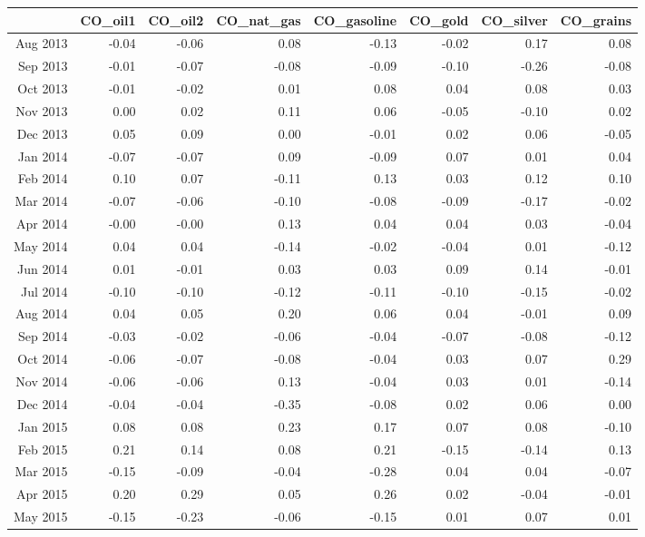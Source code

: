 \begin{tabularx}{\textwidth}{rrrrrrrr}
  \hline
 & CO\_oil1 & CO\_oil2 & CO\_nat\_gas & CO\_gasoline & CO\_gold & CO\_silver & CO\_grains \\ 
  \hline
Aug 2013 & -0.04 & -0.06 & 0.08 & -0.13 & -0.02 & 0.17 & 0.08 \\ 
  Sep 2013 & -0.01 & -0.07 & -0.08 & -0.09 & -0.10 & -0.26 & -0.08 \\ 
  Oct 2013 & -0.01 & -0.02 & 0.01 & 0.08 & 0.04 & 0.08 & 0.03 \\ 
  Nov 2013 & 0.00 & 0.02 & 0.11 & 0.06 & -0.05 & -0.10 & 0.02 \\ 
  Dec 2013 & 0.05 & 0.09 & 0.00 & -0.01 & 0.02 & 0.06 & -0.05 \\ 
  Jan 2014 & -0.07 & -0.07 & 0.09 & -0.09 & 0.07 & 0.01 & 0.04 \\ 
  Feb 2014 & 0.10 & 0.07 & -0.11 & 0.13 & 0.03 & 0.12 & 0.10 \\ 
  Mar 2014 & -0.07 & -0.06 & -0.10 & -0.08 & -0.09 & -0.17 & -0.02 \\ 
  Apr 2014 & -0.00 & -0.00 & 0.13 & 0.04 & 0.04 & 0.03 & -0.04 \\ 
  May 2014 & 0.04 & 0.04 & -0.14 & -0.02 & -0.04 & 0.01 & -0.12 \\ 
  Jun 2014 & 0.01 & -0.01 & 0.03 & 0.03 & 0.09 & 0.14 & -0.01 \\ 
  Jul 2014 & -0.10 & -0.10 & -0.12 & -0.11 & -0.10 & -0.15 & -0.02 \\ 
  Aug 2014 & 0.04 & 0.05 & 0.20 & 0.06 & 0.04 & -0.01 & 0.09 \\ 
  Sep 2014 & -0.03 & -0.02 & -0.06 & -0.04 & -0.07 & -0.08 & -0.12 \\ 
  Oct 2014 & -0.06 & -0.07 & -0.08 & -0.04 & 0.03 & 0.07 & 0.29 \\ 
  Nov 2014 & -0.06 & -0.06 & 0.13 & -0.04 & 0.03 & 0.01 & -0.14 \\ 
  Dec 2014 & -0.04 & -0.04 & -0.35 & -0.08 & 0.02 & 0.06 & 0.00 \\ 
  Jan 2015 & 0.08 & 0.08 & 0.23 & 0.17 & 0.07 & 0.08 & -0.10 \\ 
  Feb 2015 & 0.21 & 0.14 & 0.08 & 0.21 & -0.15 & -0.14 & 0.13 \\ 
  Mar 2015 & -0.15 & -0.09 & -0.04 & -0.28 & 0.04 & 0.04 & -0.07 \\ 
  Apr 2015 & 0.20 & 0.29 & 0.05 & 0.26 & 0.02 & -0.04 & -0.01 \\ 
  May 2015 & -0.15 & -0.23 & -0.06 & -0.15 & 0.01 & 0.07 & 0.01 \\ 

\end{tabularx}

